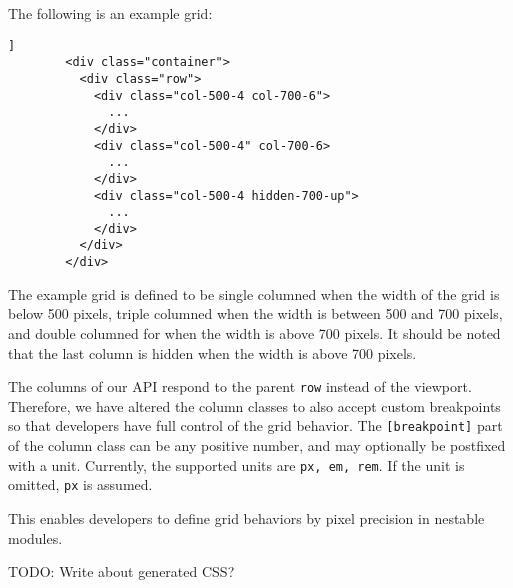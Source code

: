 \documentclass{acm_proc_article-sp}
\newcommand{\code}[1]{\texttt{#1}}
\begin{document}
      The following is an example grid:

      
      

      
      \begin{lstlisting}[gobble=8,caption={},captionpos=b,label={}]]
        <div class="container">
          <div class="row">
            <div class="col-500-4 col-700-6">
              ...
            </div>
            <div class="col-500-4" col-700-6>
              ...
            </div>
            <div class="col-500-4 hidden-700-up">
              ...
            </div>
          </div>
        </div>
      \end{lstlisting}

The example grid is defined to be single columned when the width of the grid is below 500 pixels, triple columned when the width is between 500 and 700 pixels, and double columned for when the width is above 700 pixels.
      It should be noted that the last column is hidden when the width is above 700 pixels.

      The columns of our API respond to the parent \code{row} instead of the viewport.
      Therefore, we have altered the column classes to also accept custom breakpoints so that developers have full control of the grid behavior.
      The \code{[breakpoint]} part of the column class can be any positive number, and may optionally be postfixed with a unit.
      Currently, the supported units are \code{px, em, rem}.
      If the unit is omitted, \code{px} is assumed.
            
      This enables developers to define grid behaviors by pixel precision in nestable modules.

      TODO: Write about generated CSS?
\end{document}
